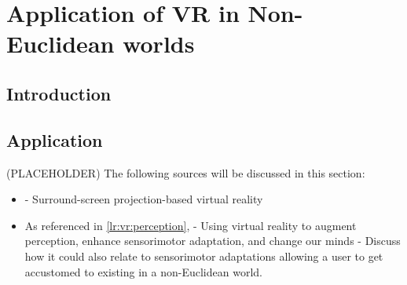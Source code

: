 \section{Application of VR in Non-Euclidean worlds}
\label{lr:cross}

	\subsection{Introduction}
	\label{lr:cross:intro}
	
	\subsection{Application}
	\label{lr:cross:application}
		(PLACEHOLDER) The following sources will be discussed in this section:
		\begin{itemize}
			\item \cite{Cruz-Neira1993} - Surround-screen projection-based virtual reality
			\item As referenced in \ref{lr:vr:perception}, \cite{Wright2014} - Using virtual reality to augment perception, enhance sensorimotor adaptation, and change our minds - Discuss how it could also relate to sensorimotor adaptations allowing a user to get accustomed to existing i\textsl{}n a non-Euclidean world.
		\end{itemize}
	
